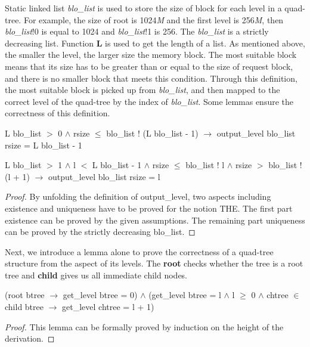 Static linked list \emph{blo\_list} is used to store the size of block for each level in a quad-tree. For example, the size of root is 1024\emph{M} and the first level is 256\emph{M}, then \emph{blo\_list}!0 is equal to 1024 and \emph{blo\_list}!1 is 256. The \emph{blo\_list} is a strictly decreasing list. Function \textbf{L} is used to get the length of a list. As mentioned above, the smaller the level, the larger size the memory block. The most suitable block means that its size has to be greater than or equal to the size of request block, and there is no smaller block that meets this condition. Through this definition, the most suitable block is picked up from \emph{blo\_list}, and then mapped to the correct level of the quad-tree by the index of \emph{blo\_list}. Some lemmas ensure the correctness of this definition.

\begin{lemma}
	L blo\_list $>$ 0 $\wedge$ rsize $\leq$ blo\_list ! (L blo\_list - 1) $\longrightarrow$ output\_level blo\_list rsize = L blo\_list - 1
\end{lemma}

\begin{lemma}
	L blo\_list $>$ 1 $\wedge$ l $<$ L blo\_list - 1 $\wedge$ rsize $\leq$ blo\_list ! l $\wedge$ rsize $>$ blo\_list ! (l + 1) $\longrightarrow$ output\_level blo\_list rsize = l
\end{lemma}

\begin{proof}
	By unfolding the definition of output\_level, two aspects including existence and uniqueness have to be proved for the notion THE. The first part existence can be proved by the given assumptions. The remaining part uniqueness can be proved by the strictly decreasing blo\_list.
\end{proof}

Next, we introduce a lemma alone to prove the correctness of a quad-tree structure from the aspect of its levels. The \textbf{root} checks whether the tree is a root tree and \textbf{child} gives us all immediate child nodes.

\begin{lemma}
	(root btree $\longrightarrow$ get\_level btree = 0) $\wedge$ (get\_level btree = l $\wedge$ l $\geq$ 0 $\wedge$ chtree $\in$ child btree $\longrightarrow$ get\_level chtree = l + 1)
\end{lemma}

\begin{proof}
	This lemma can be formally proved by induction on the height of the derivation.
\end{proof}

